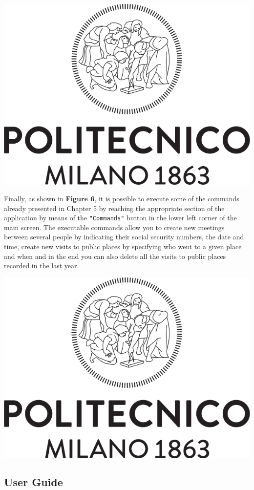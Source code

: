 \documentclass[a4paper,12pt]{article}
\begin{document}
	\begin{center}
 		\includegraphics[width = 11 cm]{polilogo.png}
	\end{center}
\pagebreak
Finally, as shown in \textbf{Figure 6}, it is possible to execute some of the commands already presented in Chapter 5 by reaching the appropriate section of the application by means of the \texttt{"Commands"} button in the lower left corner of the main screen. The executable commands allow you to create new meetings between several people by indicating their social security numbers, the date and time, create new visits to public places by specifying who went to a given place and when and in the end you can also delete all the visits to public places recorded in the last year. \par
	\begin{center}
 		\includegraphics[width = 11 cm]{polilogo.png}
	\end{center}
\subsection{User Guide}
\end{document}
